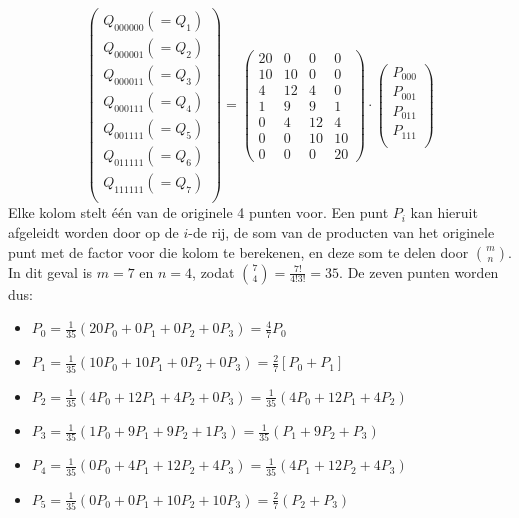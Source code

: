 \documentclass{report}
\begin{document}
\begin{itemize}
{\begin{itemize}
			$$
			\begin{pmatrix}
				Q_{000000} (=Q_1) \\
				Q_{000001} (=Q_2)\\
				Q_{000011} (=Q_3)\\
				Q_{000111} (=Q_4)\\
				Q_{001111} (=Q_5)\\
				Q_{011111} (=Q_6)\\
				Q_{111111} (=Q_7)\\
			\end{pmatrix}
			= 
			\begin{pmatrix}
				20 & 0  & 0  & 0  \\ 
				10 & 10 & 0  & 0  \\ 
				4  & 12 & 4  & 0  \\ 
				1  & 9  & 9  & 1  \\ 
				0  & 4  & 12 & 4  \\ 
				0  & 0  & 10 & 10 \\ 
				0  & 0  & 0  & 20 
			\end{pmatrix}
			\cdot 
			\begin{pmatrix}
				P_{000} \\
				P_{001} \\
				P_{011} \\
				P_{111} \\
			\end{pmatrix}
			$$
			Elke kolom stelt één van de originele 4 punten voor. Een punt $P_i$ kan hieruit afgeleidt worden door op de $i$-de rij, de som van 
			de producten van het originele punt met de factor voor die kolom te berekenen, en deze som te delen door $\binom{m}{n}$. In dit geval is $m = 7$ en $n = 4$, zodat $\binom{7}{4} = \frac{7!}{4! 3!} = 35$. De zeven punten worden dus:
			\begin{itemize}
				\item $P_0 = \frac{1}{35} (20P_0 + 0P_1  + 0P_2  + 0P_3) = \frac{4}{7}P_0$ 
				\item $P_1 = \frac{1}{35}(10P_0 + 10P_1 + 0P_2  + 0P_3) = \frac{2}{7}[P_0 + P_1]$ 
				\item $P_2 = \frac{1}{35}(4P_0  + 12P_1 + 4P_2  + 0P_3) = \frac{1}{35}(4P_0  + 12P_1 + 4P_2)$
				\item $P_3 = \frac{1}{35}(1P_0  + 9P_1 + 9P_2  + 1P_3) = \frac{1}{35}(P_1  + 9P_2 + P_3)$
				\item $P_4 = \frac{1}{35}(0P_0  + 4P_1 + 12P_2  + 4P_3) = \frac{1}{35}(4P_1  + 12P_2 + 4P_3)$
				\item $P_5 = \frac{1}{35}(0P_0  + 0P_1 + 10P_2  + 10P_3) = \frac{2}{7}(P_2 + P_3)$

\end{itemize}
\end{itemize}}
\end{itemize}
\end{document}
